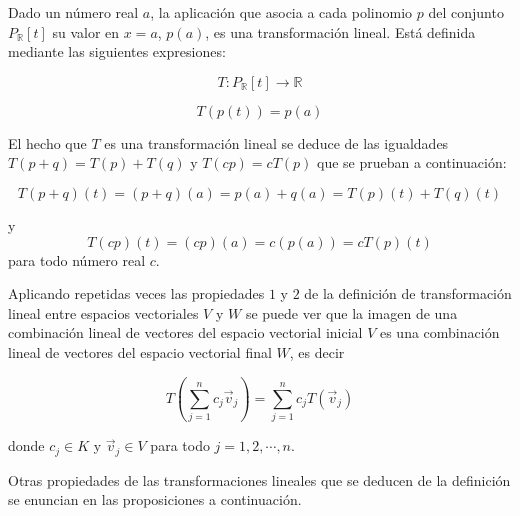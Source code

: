 \bigskip

\begin{example}
Dado un número real $a$, la aplicación que asocia a cada polinomio $p$ del conjunto  $P_\mathbb{R}\left[t\right]$ su valor en $x=a$, $p(a)$, es una transformación lineal. Está definida mediante las siguientes expresiones: 

$$T: P_\mathbb{R}\left[t\right] \rightarrow \mathbb{R}$$ 

$$T(p(t))=p(a)$$


El hecho que $T$ es una transformación lineal se deduce de las igualdades $T(p+q)=T(p) + T  (q)$ y $T(cp)=cT(p)$ que se prueban a continuación:

$$T(p+q)(t)=(p+q)(a)=p(a)+q(a)=T(p)(t)+T(q)(t)$$


\noindent
y
$$T(cp)(t)=(cp)(a)=c(p(a))=cT(p)(t)$$
\noindent
para todo número real $c$.
\end{example}




\bigskip

Aplicando repetidas veces las propiedades $1$ y $2$  de la definición de transformación lineal entre espacios vectoriales $V$ y $W$ se puede ver que la imagen de una combinación lineal de vectores  del espacio vectorial inicial $V$ es una combinación lineal de vectores del espacio vectorial final $W$, es decir 

$$T(\sum_{j=1}^{n}c_j\vec{v}_j)=\sum_{j=1}^{n}c_jT(\vec{v}_j)$$

\bigskip
\noindent
donde $c_j  \in K$ y $\vec{v}_j  \in V$  para todo $j=1,2, \cdots, n$.


\bigskip


\bigskip

\bigskip

Otras propiedades de las transformaciones lineales que se deducen de la definición  se enuncian en las proposiciones a continuación.

\bigskip

\bigskip



